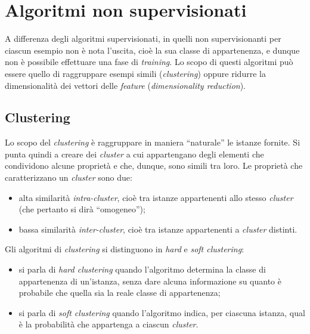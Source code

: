 \section{Algoritmi non supervisionati}
A differenza degli algoritmi supervisionati, in quelli non supervisionanti per ciascun esempio non è nota l'uscita, cioè la sua classe di appartenenza, e dunque non è possibile effettuare una fase di \emph{training}. Lo scopo di questi algoritmi può essere quello di raggruppare esempi simili (\emph{clustering}) oppure ridurre la dimensionalità dei vettori delle \emph{feature} (\emph{dimensionality reduction}).

\subsection{Clustering}
Lo scopo del \emph{clustering} è raggruppare in maniera ``naturale'' le istanze fornite. Si punta quindi a creare dei \emph{cluster} a cui appartengano degli elementi che condividono alcune proprietà e che, dunque, sono simili tra loro. Le proprietà che caratterizzano un \emph{cluster} sono due:
\begin{itemize}
\item alta similarità \emph{intra-cluster}, cioè tra istanze appartenenti allo stesso \emph{cluster} (che pertanto si dirà ``omogeneo'');
\item bassa similarità \emph{inter-cluster}, cioè tra istanze appartenenti a \emph{cluster} distinti.
\end{itemize}

Gli algoritmi di \emph{clustering} si distinguono in \emph{hard} e \emph{soft clustering}:
\begin{itemize}
\item si parla di \emph{hard clustering} quando l'algoritmo determina la classe di appartenenza di un'istanza, senza dare alcuna informazione su quanto è probabile che quella sia la reale classe di appartenenza;
\item si parla di \emph{soft clustering} quando l'algoritmo indica, per ciascuna istanza, qual è la probabilità che appartenga a ciascun \emph{cluster}.
\end{itemize}

